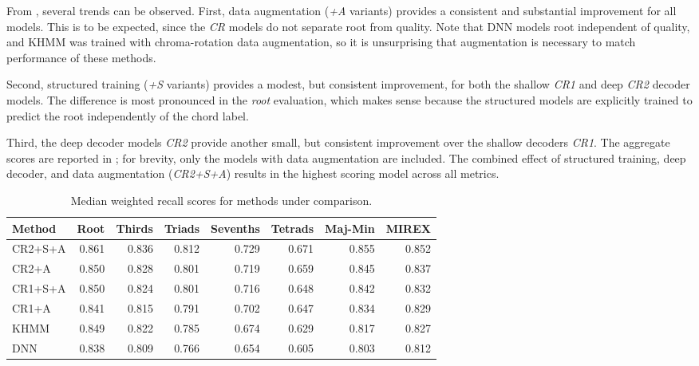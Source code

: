 \documentclass{article}
\begin{document}
From , several trends can be observed.
First, data augmentation (\emph{+A} variants) provides a consistent and substantial improvement for all models.
This is to be expected, since the \emph{CR} models do not separate root from quality.
Note that DNN models root independent of quality, and KHMM was trained with chroma-rotation data augmentation, so it is unsurprising that augmentation is necessary to match performance of these methods.

Second, structured training (\emph{+S} variants) provides a modest, but consistent improvement, for both the shallow \emph{CR1} and deep \emph{CR2} decoder models.
The difference is most pronounced in the \emph{root} evaluation, which makes sense because the structured models are explicitly trained to predict the root independently of the chord label.

Third, the deep decoder models \emph{CR2} provide another small, but consistent improvement over the shallow decoders \emph{CR1}.
The aggregate scores are reported in ; for brevity, only the models with data augmentation are included.
The combined effect of structured training, deep decoder, and data augmentation (\emph{CR2+S+A}) results in the highest scoring model across all metrics.

\begin{table}
    \centering
    \caption{Median weighted recall scores for methods under comparison.\label{tab:results}}
    \begin{tabular}{lrrrrrrr}
        \toprule
        Method  & Root & Thirds & Triads & Sevenths & Tetrads & Maj-Min & MIREX\\
        \midrule
        CR2+S+A & 0.861 & 0.836 & 0.812 & 0.729 & 0.671 & 0.855 & 0.852\\
        CR2+A   & 0.850 & 0.828 & 0.801 & 0.719 & 0.659 & 0.845 & 0.837\\
        CR1+S+A & 0.850 & 0.824 & 0.801 & 0.716 & 0.648 & 0.842 & 0.832\\
        CR1+A   & 0.841 & 0.815 & 0.791 & 0.702 & 0.647 & 0.834 & 0.829\\
        \midrule
        KHMM~\cite{cho2014improved}    & 0.849 & 0.822 & 0.785 & 0.674 & 0.629 & 0.817 & 0.827\\
        DNN~\cite{humphrey2015four}     & 0.838 & 0.809 & 0.766 & 0.654 & 0.605 & 0.803 & 0.812\\
        \bottomrule
    \end{tabular}
\end{table}
\end{document}
